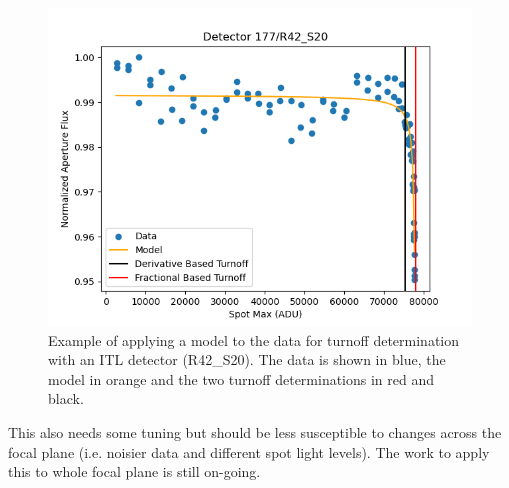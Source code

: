 \begin{figure}[ht]
    \centering
    \includegraphics[width=0.95\linewidth]{figures/Spot_Photometry_Model.png}
    \caption{Example of applying a model to the data for turnoff determination with an ITL detector (R42\_S20). The data is shown in blue, the model in orange and the two turnoff determinations in red and black.}
    \label{fig:Spot_Model}
\end{figure}

This also needs some tuning but should be less susceptible to changes across the focal plane (i.e. noisier data and different spot light levels). The work to apply this to whole focal plane is still on-going.

\clearpage
